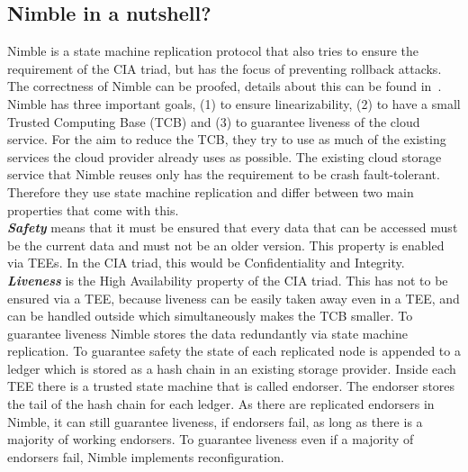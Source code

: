 \subsection{Nimble in a nutshell?}
Nimble is a state machine replication protocol that also tries to ensure the requirement of the CIA triad, but has the focus of preventing rollback attacks. The correctness of Nimble can be proofed, details about this can be found in~\cite{Nimble}.\\
Nimble has three important goals, (1) to ensure linearizability, (2) to have a small Trusted Computing Base (TCB) and (3) to guarantee liveness of the cloud service. For the aim to reduce the TCB, they try to use as much of the existing services the cloud provider already uses as possible. The existing cloud storage service that Nimble reuses only has the requirement to be crash fault-tolerant. Therefore they use state machine replication and differ between two main properties that come with this.\\
	\textbf{\textit{Safety}} means that it must be ensured that every data that can be accessed must be the current data and must not be an older version. This property is enabled via TEEs. In the CIA triad, this would be Confidentiality and Integrity.\\
	\textbf{\textit{Liveness}} is the High Availability property of the CIA triad. This has not to be ensured via a TEE, because liveness can be easily taken away even in a TEE, and can be handled outside which simultaneously makes the TCB smaller.
	To guarantee liveness Nimble stores the data redundantly via state machine replication. To guarantee safety the state of each replicated node is appended to a ledger which is stored as a hash chain in an existing storage provider. Inside each TEE there is a trusted state machine that is called endorser. The endorser stores the tail of the hash chain for each ledger. As there are replicated endorsers in Nimble, it can still guarantee liveness, if endorsers fail, as long as there is a majority of working endorsers. To guarantee liveness even if a majority of endorsers fail, Nimble implements reconfiguration. 
